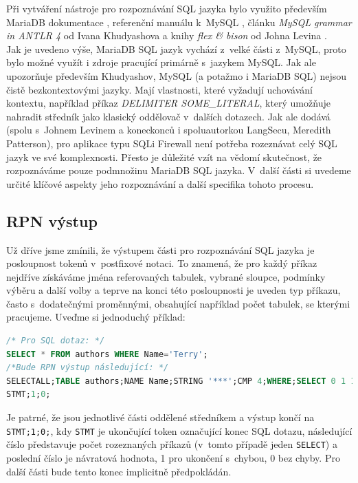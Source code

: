 Při vytváření nástroje pro rozpoznávání SQL jazyka bylo využito především MariaDB dokumentace \cite{MariaDB}, referenční manuálu k~MySQL \cite{MySQL},
článku \textit{MySQL grammar in ANTLR 4} od Ivana Khudyashova \cite{Khudyashov2018} a knihy \textit{flex \& bison} od Johna Levina \cite{levine2009}. \\

Jak je uvedeno výše, MariaDB SQL jazyk vychází z~velké části z~MySQL, proto bylo možné využít i zdroje pracující primárně s~jazykem MySQL.
Jak ale upozorňuje především Khudyashov, MySQL (a potažmo i MariaDB SQL) nejsou čistě bezkontextovými jazyky. Mají vlastnosti, které vyžadují
uchovávání kontextu, například příkaz \textit{DELIMITER SOME\_LITERAL}, který umožňuje nahradit středník jako klasický oddělovač v~dalších dotazech.
Jak ale dodává (spolu s~Johnem Levinem a koneckonců i spoluautorkou LangSecu, Meredith Patterson), pro aplikace typu SQLi Firewall není potřeba rozeznávat celý
SQL jazyk ve své komplexnosti. Přesto je důležité vzít na vědomí skutečnost, že rozpoznáváme pouze podmnožinu MariaDB SQL jazyka. 
V~další části si uvedeme určité klíčové aspekty jeho rozpoznávání a další specifika tohoto procesu. 

\subsection{RPN výstup} \label{subsec:6:rpn}
Už dříve jsme zmínili, že výstupem části pro rozpoznávání SQL jazyka je posloupnost tokenů v~postfixové notaci. To znamená, že pro každý
příkaz nejdříve získáváme jména referovaných tabulek, vybrané sloupce, podmínky výběru a další volby a teprve na konci této 
posloupnosti je uveden typ příkazu, často s~dodatečnými proměnnými, obsahující například počet tabulek, se kterými pracujeme.
Uveďme si jednoduchý příklad:

\begin{lstlisting}[language=sql]
/* Pro SQL dotaz: */
SELECT * FROM authors WHERE Name='Terry';
/*Bude RPN výstup následující: */
SELECTALL;TABLE authors;NAME Name;STRING '***';CMP 4;WHERE;SELECT 0 1 1;
STMT;1;0;
\end{lstlisting}

Je patrné, že jsou jednotlivé části oddělené středníkem a výstup končí na \texttt{STMT;1;0;}, kdy \texttt{STMT} je ukončující token
označující konec SQL dotazu, následující číslo představuje počet rozeznaných příkazů (v~tomto případě jeden \texttt{SELECT}) a
poslední číslo je návratová hodnota, 1 pro ukončení s~chybou, 0 bez chyby. Pro další části bude tento konec implicitně předpokládán. \\

